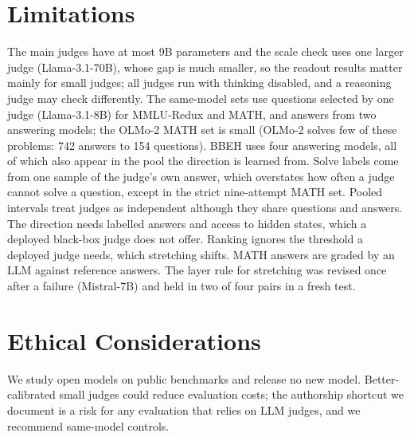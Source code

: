 \documentclass[11pt]{article}
\begin{document}
\section*{Limitations}

The main judges have at most 9B parameters and the scale check uses one larger judge (Llama-3.1-70B), whose gap is much smaller, so the readout results matter mainly for small judges; all judges run with thinking disabled, and a reasoning judge may check differently. The same-model sets use questions selected by one judge (Llama-3.1-8B) for MMLU-Redux and MATH, and answers from two answering models; the OLMo-2 MATH set is small (OLMo-2 solves few of these problems: 742 answers to 154 questions). BBEH uses four answering models, all of which also appear in the pool the direction is learned from. Solve labels come from one sample of the judge's own answer, which overstates how often a judge cannot solve a question, except in the strict nine-attempt MATH set. Pooled intervals treat judges as independent although they share questions and answers. The direction needs labelled answers and access to hidden states, which a deployed black-box judge does not offer. Ranking ignores the threshold a deployed judge needs, which stretching shifts. MATH answers are graded by an LLM against reference answers. The layer rule for stretching was revised once after a failure (Mistral-7B) and held in two of four pairs in a fresh test.

\section*{Ethical Considerations}

We study open models on public benchmarks and release no new model. Better-calibrated small judges could reduce evaluation costs; the authorship shortcut we document is a risk for any evaluation that relies on LLM judges, and we recommend same-model controls.



\appendix

\end{document}
